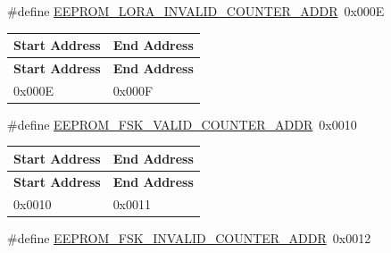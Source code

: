 \begin{DoxyCompactItemize}
\#define \hyperlink{group__defines__eeprom__address__map_ga09e7db19ac65e0c28bae5b46f25ffe36}{E\+E\+P\+R\+O\+M\+\_\+\+L\+O\+R\+A\+\_\+\+I\+N\+V\+A\+L\+I\+D\+\_\+\+C\+O\+U\+N\+T\+E\+R\+\_\+\+A\+D\+DR}~0x000E
\begin{DoxyCompactList}\small\item\em \tabulinesep=1mm
\begin{longtabu} spread 0pt [c]{*{2}{|X[-1]}|}
\hline
\rowcolor{\tableheadbgcolor}\textbf{ Start Address}&\textbf{ End Address  }\\
\endfirsthead
\hline
\endfoot
\hline
\rowcolor{\tableheadbgcolor}\textbf{ Start Address}&\textbf{ End Address  }\\
\endhead
0x000E&0x000F \\
\end{longtabu}
\end{DoxyCompactList}\item 
\mbox{\label{group__defines__eeprom__address__map_gae0a7ddd98b2a6e5c878c65c223e8d1d9}} 
\#define \hyperlink{group__defines__eeprom__address__map_gae0a7ddd98b2a6e5c878c65c223e8d1d9}{E\+E\+P\+R\+O\+M\+\_\+\+F\+S\+K\+\_\+\+V\+A\+L\+I\+D\+\_\+\+C\+O\+U\+N\+T\+E\+R\+\_\+\+A\+D\+DR}~0x0010
\begin{DoxyCompactList}\small\item\em \tabulinesep=1mm
\begin{longtabu} spread 0pt [c]{*{2}{|X[-1]}|}
\hline
\rowcolor{\tableheadbgcolor}\textbf{ Start Address}&\textbf{ End Address  }\\
\endfirsthead
\hline
\endfoot
\hline
\rowcolor{\tableheadbgcolor}\textbf{ Start Address}&\textbf{ End Address  }\\
\endhead
0x0010&0x0011 \\
\end{longtabu}
\end{DoxyCompactList}\item 
\mbox{\label{group__defines__eeprom__address__map_ga6fb56c8041b356cfc0e4de4731eeb4fd}} 
\#define \hyperlink{group__defines__eeprom__address__map_ga6fb56c8041b356cfc0e4de4731eeb4fd}{E\+E\+P\+R\+O\+M\+\_\+\+F\+S\+K\+\_\+\+I\+N\+V\+A\+L\+I\+D\+\_\+\+C\+O\+U\+N\+T\+E\+R\+\_\+\+A\+D\+DR}~0x0012
\begin{DoxyCompactList}\small\item\em \tabulinesep=1mm

\end{DoxyCompactList}
\end{DoxyCompactItemize}
